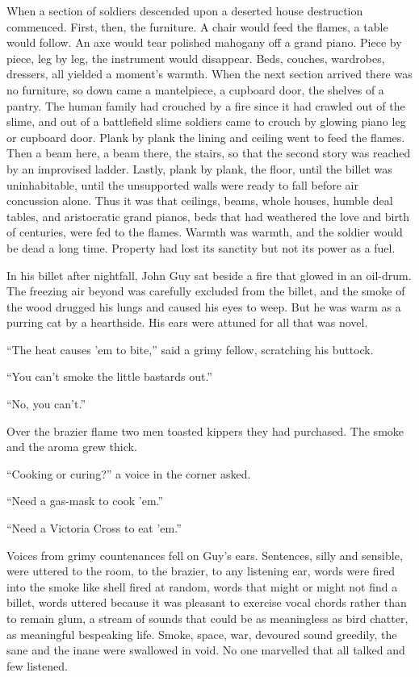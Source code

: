 When a section of soldiers descended upon a deserted house destruction commenced. First, 
then, the furniture. A chair would feed the flames, a table would follow. An axe would tear 
polished mahogany off a grand piano. Piece by piece, leg by leg, the instrument would 
disappear. Beds, couches, wardrobes, dressers, all yielded a moment's warmth. When the next 
section arrived there was no furniture, so down came a mantelpiece, a cupboard door, the 
shelves of a pantry. The human family had crouched by a fire since it had crawled out of 
the slime, and out of a battlefield slime soldiers came to crouch by glowing piano leg or 
cupboard door. Plank by plank the lining and ceiling went to feed the flames. Then a beam 
here, a beam there, the stairs, so that the second story was reached by an improvised ladder. 
Lastly, plank by plank, the floor, until the billet was uninhabitable, until the unsupported 
walls were ready to fall before air concussion alone. Thus it was that ceilings, beams, whole 
houses, humble deal tables, and aristocratic grand pianos, beds that had weathered the love 
and birth of centuries, were fed to the flames. Warmth was warmth, and the soldier would be 
dead a long time. Property had lost its sanctity but not its power as a fuel.

In his billet after nightfall, John Guy sat beside a fire that glowed in an oil-drum. The 
freezing air beyond was carefully excluded from the billet, and the smoke of the wood drugged 
his lungs and caused his eyes to weep. But he was warm as a purring cat by a hearthside. His 
ears were attuned for all that was novel.

``The heat causes 'em to bite,'' said a grimy fellow, scratching his buttock.

``You can't smoke the little bastards out.''

``No, you can't.''

Over the brazier flame two men toasted kippers they had purchased. The smoke and the aroma 
grew thick.

``Cooking or curing?'' a voice in the corner asked.

``Need a gas-mask to cook 'em.''

``Need a Victoria Cross to eat 'em.''

Voices from grimy countenances fell on Guy's ears. Sentences, silly and sensible, were 
uttered to the room, to the brazier, to any listening ear, words were fired into the 
smoke like shell fired at random, words that might or might not find a billet, words 
uttered because it was pleasant to exercise vocal chords rather than to remain glum, 
a stream of sounds that could be as meaningless as bird chatter, as meaningful bespeaking 
life. Smoke, space, war, devoured sound greedily, the sane and the inane were swallowed in 
void. No one marvelled that all talked and few listened.

